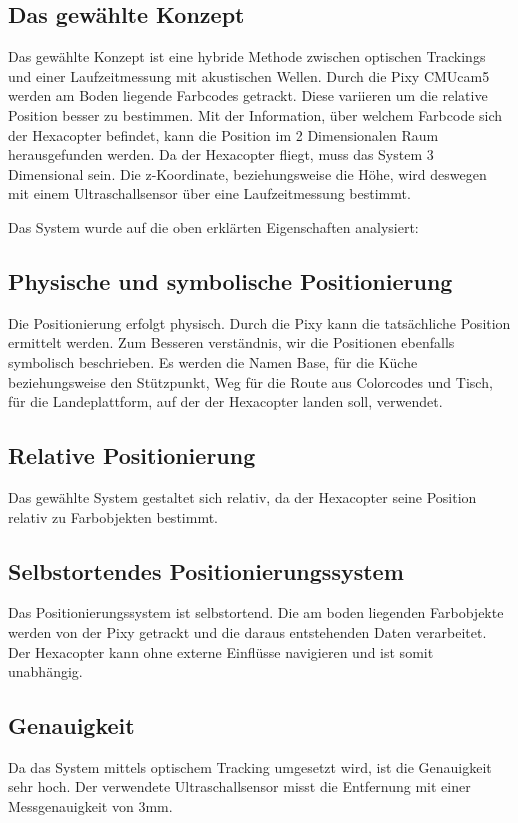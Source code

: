   \subsection{Das gewählte Konzept}
  Das gewählte Konzept ist eine hybride Methode zwischen optischen Trackings und einer Laufzeitmessung mit akustischen Wellen. 
  Durch die Pixy CMUcam5 werden am Boden liegende Farbcodes getrackt. Diese variieren um die relative Position besser zu bestimmen. Mit der Information, über welchem Farbcode sich der Hexacopter befindet, kann die Position im 2 Dimensionalen Raum herausgefunden werden. Da der Hexacopter fliegt, muss das System 3 Dimensional sein. Die z-Koordinate, beziehungsweise die Höhe, wird deswegen mit einem Ultraschallsensor über eine Laufzeitmessung bestimmt.

  Das System wurde auf die oben erklärten Eigenschaften analysiert:

  \subsection*{Physische und symbolische Positionierung}
  Die Positionierung erfolgt physisch. Durch die Pixy kann die tatsächliche Position ermittelt werden.
  Zum Besseren verständnis, wir die Positionen ebenfalls symbolisch beschrieben. Es werden die Namen Base, für die Küche beziehungsweise den Stützpunkt, Weg für die Route aus Colorcodes und Tisch, für die Landeplattform, auf der der Hexacopter landen soll, verwendet.

  \subsection*{Relative Positionierung}
  Das gewählte System gestaltet sich relativ, da der Hexacopter seine Position relativ zu Farbobjekten bestimmt.

  \subsection*{Selbstortendes Positionierungssystem}
  Das Positionierungssystem ist selbstortend. Die am boden liegenden Farbobjekte werden von der Pixy getrackt und die daraus entstehenden Daten verarbeitet. Der Hexacopter kann ohne externe Einflüsse navigieren und ist somit unabhängig.

  \subsection*{Genauigkeit}
  Da das System mittels optischem Tracking umgesetzt wird, ist die Genauigkeit sehr hoch.
  Der verwendete Ultraschallsensor misst die Entfernung mit einer Messgenauigkeit von 3mm. 
  
